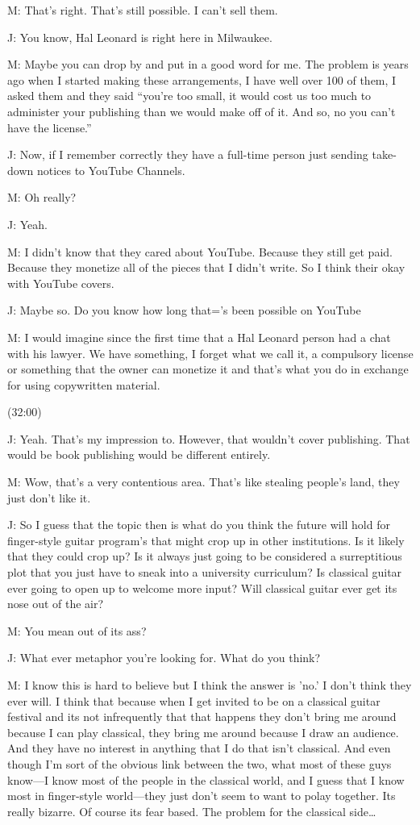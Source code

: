 \documentclass[11pt]{article}
\begin{document}
M: That's right. That's still possible. I can't sell them.

J: You know, Hal Leonard is right here in Milwaukee.

M: Maybe you can drop by and put in a good word for me. The problem is years ago when I started making these arrangements, I have well over 100 of them, I asked them and they said ``you're too small, it would cost us too much to administer your publishing than we would make off of it. And so, no you can't have the license.'' 

J: Now, if I remember correctly they have a full-time person just sending take-down notices to YouTube Channels.

M: Oh really?

J: Yeah. 

M: I didn't know that they cared about YouTube. Because they still get paid.  Because they monetize all of the pieces that I didn't write. So I think their okay with YouTube covers. 

J: Maybe so. Do you know how long that='s been possible on YouTube

M: I would imagine since the first time that a Hal Leonard person had a chat with his lawyer. We have something, I forget what we call it, a compulsory license or something that the owner can monetize it and that's what you do in exchange for using copywritten material.

(32:00)

J: Yeah. That's my impression to. However, that wouldn't cover publishing. That would be book publishing would be different entirely.

M: Wow, that's a very contentious area. That's like stealing people's land, they just don't like it. 

J: So I guess that the topic then is what do you think the future will hold for finger-style guitar program's that might crop up in other institutions. Is it likely that they could crop up? Is it always just going to be considered a surreptitious plot that you just have to sneak into a university curriculum? Is classical guitar ever going to open up to welcome more input? Will classical guitar ever get its nose out of the air?

M: You mean out of its ass?

J: What ever metaphor you're looking for. What do you think?

M: I know this is hard to believe but I think the answer is 'no.' I don't think they ever will. I think that because when I get invited to be on a classical guitar festival and its not infrequently that that happens they don't bring me around because I can play classical, they bring me around because I draw an audience. And they have no interest in anything that I do that isn't classical. And even though I'm sort of the obvious link between the two, what most of these guys know—I know most of the people in the classical world, and I guess that I know most in finger-style world—they just don't seem to want to polay together. Its really bizarre. Of course its fear based. The problem for the classical side…
\end{document}
